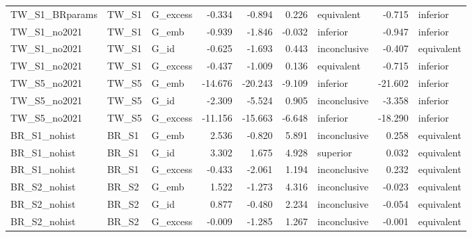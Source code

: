 \begin{tabular}{lllrrrlrl}
TW\_S1\_BRparams & TW\_S1 & G\_excess & -0.334 & -0.894 & 0.226 & equivalent & -0.715 & inferior \\
TW\_S1\_no2021 & TW\_S1 & G\_emb & -0.939 & -1.846 & -0.032 & inferior & -0.947 & inferior \\
TW\_S1\_no2021 & TW\_S1 & G\_id & -0.625 & -1.693 & 0.443 & inconclusive & -0.407 & equivalent \\
TW\_S1\_no2021 & TW\_S1 & G\_excess & -0.437 & -1.009 & 0.136 & equivalent & -0.715 & inferior \\
TW\_S5\_no2021 & TW\_S5 & G\_emb & -14.676 & -20.243 & -9.109 & inferior & -21.602 & inferior \\
TW\_S5\_no2021 & TW\_S5 & G\_id & -2.309 & -5.524 & 0.905 & inconclusive & -3.358 & inferior \\
TW\_S5\_no2021 & TW\_S5 & G\_excess & -11.156 & -15.663 & -6.648 & inferior & -18.290 & inferior \\
BR\_S1\_nohist & BR\_S1 & G\_emb & 2.536 & -0.820 & 5.891 & inconclusive & 0.258 & equivalent \\
BR\_S1\_nohist & BR\_S1 & G\_id & 3.302 & 1.675 & 4.928 & superior & 0.032 & equivalent \\
BR\_S1\_nohist & BR\_S1 & G\_excess & -0.433 & -2.061 & 1.194 & inconclusive & 0.232 & equivalent \\
BR\_S2\_nohist & BR\_S2 & G\_emb & 1.522 & -1.273 & 4.316 & inconclusive & -0.023 & equivalent \\
BR\_S2\_nohist & BR\_S2 & G\_id & 0.877 & -0.480 & 2.234 & inconclusive & -0.054 & equivalent \\
BR\_S2\_nohist & BR\_S2 & G\_excess & -0.009 & -1.285 & 1.267 & inconclusive & -0.001 & equivalent \\
\bottomrule
\end{tabular}
